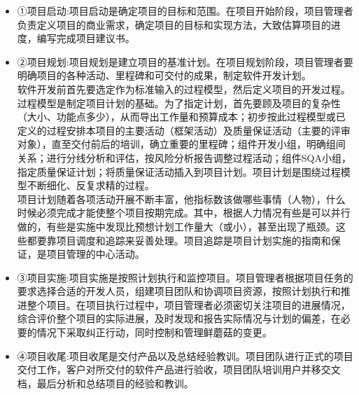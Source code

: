 \documentclass[UTF8,nofonts]{ctexart}
\begin{document}
\begin{itemize}
 \setlength{\itemsep}{0pt}
 \setlength{\parskip}{0pt}
 \setlength{\parsep}{0pt}
\item ①项目启动:项目启动是确定项目的目标和范围。在项目开始阶段，项目管理者负责定义项目的商业需求，确定项目的目标和实现方法，大致估算项目的进度，编写完成项目建议书。
\item	②项目规划:项目规划是建立项目的基准计划。在项目规划阶段，项目管理者要明确项目的各种活动、里程碑和可交付的成果，制定软件开发计划。\\
软件开发前首先要选定作为标准输入的过程模型，然后定义项目的开发过程。过程模型是制定项目计划的基础。为了指定计划，首先要顾及项目的复杂性（大小、功能点多少），从而导出工作量和预算成本；初步按此过程模型或已定义的过程安排本项目的主要活动（框架活动）及质量保证活动（主要的评审对象），直至交付前后的培训，确立重要的里程碑；组件开发小组，明确组间关系；进行分线分析和评估，按风险分析报告调整过程活动；组件SQA小组，指定质量保证计划；将质量保证活动插入到项目计划。项目计划是围绕过程模型不断细化、反复求精的过程。\\项目计划随着各项活动开展不断丰富，他指标数该做哪些事情（人物），什么时候必须完成才能使整个项目按期完成。其中，根据人力情况有些是可以并行做的，有些是实施中发现比预想计划工作量大（或小），甚至出现了瓶颈。这些都要靠项目调度和追踪来妥善处理。项目追踪是项目计划实施的指南和保证，是项目管理的中心活动。
\item	③项目实施:项目实施是按照计划执行和监控项目。项目管理者根据项目任务的要求选择合适的开发人员，组建项目团队和协调项目资源，按照计划执行和推进整个项目。在项目执行过程中，项目管理者必须密切关注项目的进展情况，综合评价整个项目的实际进展，及时发现和报告实际情况与计划的偏差，在必要的情况下采取纠正行动，同时控制和管理鲜蘑菇的变更。
\item	④项目收尾:项目收尾是交付产品以及总结经验教训。项目团队进行正式的项目交付工作，客户对所交付的软件产品进行验收，项目团队培训用户并移交文档，最后分析和总结项目的经验和教训。
\end{itemize}
\end{document}
